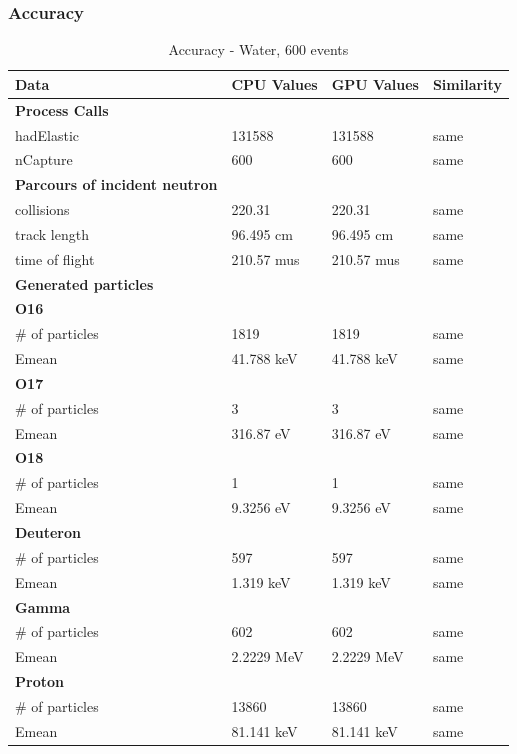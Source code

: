 \documentclass[12pt]{article}
\begin{document}
	\subsubsection{Accuracy}
		\begin{table}[H]
		\centering
		\caption{Accuracy - Water, 600 events}\label{sys3Acc}
		\begin{tabular}{lp{2.3cm}p{2.3cm}l}
		\toprule
		\bf Data & CPU Values & GPU Values &Similarity\\\midrule
		\bf Process Calls&&&\\
		hadElastic&131588&131588&same\\
		nCapture&600&600&same\\
	
		\midrule
		\bf Parcours of incident neutron&&&\\
		collisions&220.31&220.31&same\\
		track length&96.495 cm&96.495 cm&same\\
		time of flight&210.57 mus&210.57 mus&same\\

		\midrule
		\bf Generated particles&&&\\
		\bf{O16}&&&\\
		\# of particles&1819&1819&same\\
		Emean&41.788 keV&41.788 keV&same\\
		
		\bf{O17}&&&\\
		\# of particles&3&3&same\\
		Emean&316.87 eV&316.87 eV&same\\
		
		\bf{O18}&&&\\
		\# of particles&1&1&same\\
		Emean&9.3256 eV&9.3256 eV&same\\	
		\bf{Deuteron}&&&\\
		\# of particles&597&597&same\\
		Emean&1.319 keV&1.319 keV&same\\	
		\bf{Gamma}&&&\\
		\# of particles&602&602&same\\
		Emean&2.2229 MeV&2.2229 MeV&same\\	
		\bf{Proton}&&&\\
		\# of particles&13860&13860&same\\
		Emean&81.141 keV&81.141 keV&same\\\bottomrule
		\end{tabular}
		\end{table}
		\break
\end{document}
